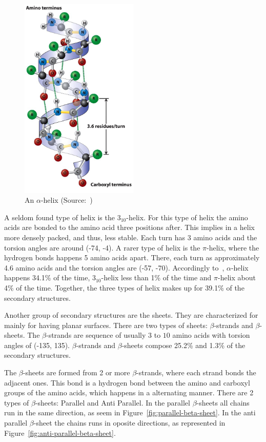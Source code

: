 \begin{figure}
    \centering
    \includegraphics[width=0.5\textwidth]{Figuras/alpha-helix.jpeg}
    \caption{An $\alpha$-helix (Source:~\cite{lodish2008molecular})}
    \label{fig:alpha-helix}
\end{figure}

A seldom found type of helix is the $3_{10}$-helix. For this type of helix the amino acids are bonded to the amino acid three positions after. This implies in a helix more densely packed, and thus, less stable. Each turn has $3$ amino acids and the torsion angles are around (-74, -4). A rarer type of helix is the $\pi$-helix, where the hydrogen bonds happens 5 amino acids apart. There, each turn as approximately 4.6 amino acids and the torsion angles are (-57, -70). Accordingly to~\cite{borguesan2015apl}, $\alpha$-helix happens 34.1\% of the time, $3_{10}$-helix less than 1\% of the time and $\pi$-helix about 4\% of the time. Together, the three types of helix makes up for 39.1\% of the secondary structures.

Another group of secondary structures are the sheets. They are characterized for mainly for having planar surfaces. There are two types of sheets: $\beta$-strands and $\beta$-sheets. The $\beta$-strands are sequence of usually $3$ to $10$ amino acids with torsion angles of (-135, 135). $\beta$-strands and $\beta$-sheets compose 25.2\% and 1.3\% of the secondary structures.

The $\beta$-sheets are formed from 2 or more $\beta$-strands, where each strand bonds the adjacent ones. This bond is a hydrogen bond between the amino and carboxyl groups of the amino acids, which happens in a alternating manner. There are 2 types of $\beta$-sheets: Parallel and Anti Parallel. In the parallel $\beta$-sheets all chains run in the same direction, as seem in Figure~\ref{fig:parallel-beta-sheet}. In the anti parallel $\beta$-sheet the chains
runs in oposite directions, as represented in Figure~\ref{fig:anti-parallel-beta-sheet}.

